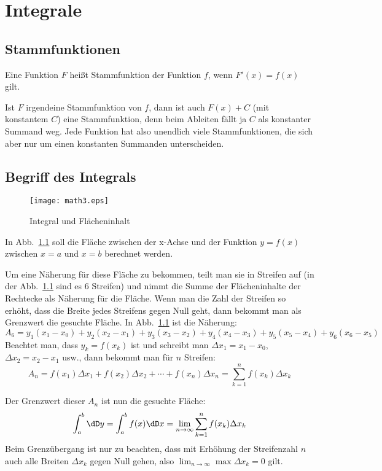 \chapter{Integrale}
\section{Stammfunktionen}
Eine Funktion $F$ heißt Stammfunktion der Funktion $f$, wenn $F'(x)=f(x)$
gilt.

Ist $F$ irgendeine Stammfunktion von $f$, dann ist auch $F(x)+C$ (mit
konstantem $C$) eine Stammfunktion, denn beim Ableiten fällt ja $C$ als
konstanter Summand weg. Jede Funktion hat also unendlich viele
Stammfunktionen, die sich aber nur um einen konstanten Summanden
unterscheiden.

\section{Begriff des Integrals}

\begin{figure}[htbp]\centering
  \texttt{[image: math3.eps]}
  \caption{Integral und Flächeninhalt}
  \label{fig:6}
\end{figure}

In Abb.~\ref{fig:6} soll die Fläche zwischen der x-Achse und der Funktion
$y=f(x)$ zwischen $x=a$ und $x=b$ berechnet werden.

Um eine Näherung für diese Fläche zu bekommen, teilt man sie in Streifen auf
(in der Abb.~\ref{fig:6} sind es 6 Streifen) und nimmt die Summe der
Flächeninhalte der Rechtecke als Näherung für die Fläche. Wenn man die Zahl
der Streifen so erhöht, dass die Breite jedes Streifens gegen Null geht, dann
bekommt man als Grenzwert die gesuchte Fläche. In Abb.~\ref{fig:6} ist die
Näherung:
\[
A_6=y_1(x_1-x_0)+y_2(x_2-x_1)+y_3(x_3-x_2)
+y_4(x_4-x_3)+y_5(x_5-x_4)+y_6(x_6-x_5)
\]
Beachtet man, dass $y_k=f(x_k)$ ist und schreibt man $\Delta x_1=x_1-x_0$,
$\Delta x_2=x_2-x_1$ usw., dann bekommt man für $n$ Streifen:
\[
A_n=f(x_1)\Delta x_1+f(x_2)\Delta x_2+\cdots+f(x_n)\Delta x_n=
\sum_{k=1}^n f(x_k)\Delta x_k
\]

Der Grenzwert dieser $A_n$ ist nun die gesuchte Fläche:
\begin{equation}
  \label{eq:33}
  \int_a^b \dD y=
  \int_a^b f(x)\dD x=\lim_{n\to\infty}\sum_{k=1}^n f(x_k)\Delta x_k
\end{equation}
Beim Grenzübergang ist nur zu beachten, dass mit Erhöhung der Streifenzahl $n$
auch alle Breiten $\Delta x_k$ gegen Null gehen, also
$\lim_{n\to\infty}\max\Delta x_k=0$ gilt.

